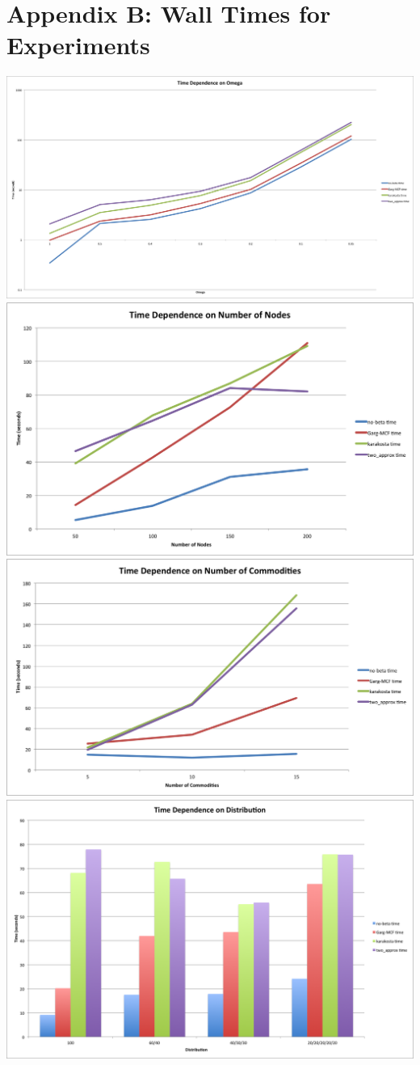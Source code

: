 \section*{Appendix B: Wall Times for Experiments}
\includegraphics[width = \textwidth]{figures/omegas-time.png}
\includegraphics[width = \textwidth]{figures/nodes-time.png}
\includegraphics[width = \textwidth]{figures/commodities-time.png}
\includegraphics[width = \textwidth]{figures/distribution-time.png}
